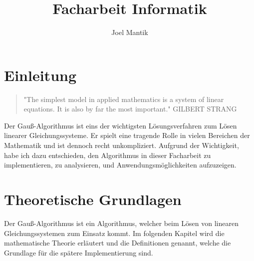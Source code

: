 \documentclass[a4paper, 12pt]{report}
\title{Facharbeit Informatik}
\author{Joel Mantik}
\begin{document}
\maketitle
\begin{sloppypar}
\tableofcontents

\chapter{Einleitung}
\begin{quote}
    "The simplest model in applied mathematics is a system of linear equations. It is also by far the most important."
    \newline GILBERT STRANG
\end{quote}
Der Gauß-Algorithmus ist eins der wichtigsten Lösungsverfahren zum Lösen linearer Gleichungssysteme.
Er spielt eine tragende Rolle in vielen Bereichen der Mathematik und ist dennoch  recht unkompliziert.
    Aufgrund der Wichtigkeit, habe ich dazu entschieden, den Algorithmus in dieser
Facharbeit zu implementieren,
zu analysieren, und Anwendungsmöglichkeiten aufzuzeigen.

{\let\clearpage\relax \chapter{Theoretische Grundlagen}}

Der Gauß-Algorithmus ist ein Algorithmus, welcher beim Lösen von linearen Gleichungssystemen zum Einsatz kommt.
Im folgenden Kapitel wird die mathematische
Theorie erläutert und die Definitionen genannt, welche die Grundlage für die spätere Implementierung sind.


\end{sloppypar}
\end{document}
